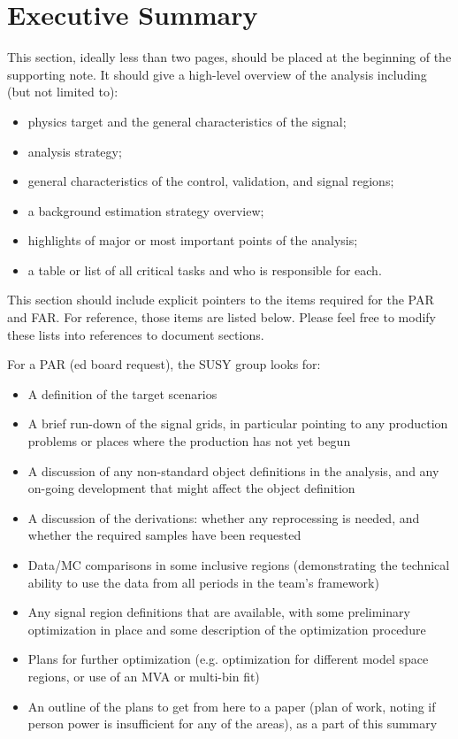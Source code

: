 \section{Executive Summary}

This section, ideally less than two pages, should be placed at the beginning of the supporting note.
It should give a high-level overview of the analysis including (but not limited to):
\begin{itemize}
\item physics target and the general characteristics of the signal;
\item analysis strategy;
\item general characteristics of the control, validation, and signal regions;
\item a background estimation strategy overview;
\item highlights of major or most important points of the analysis;
\item a table or list of all critical tasks and who is responsible for each.
\end{itemize}

This section should include explicit pointers to the items required for the PAR and FAR.  For reference, those items are listed below. Please feel free to modify these lists into references to document sections.

For a PAR (ed board request), the SUSY group looks for:
\begin{itemize}
\item A definition of the target scenarios
\item A brief run-down of the signal grids, in particular pointing to any production problems or places where the production has not yet begun
\item A discussion of any non-standard object definitions in the analysis, and any on-going development that might affect the object definition
\item A discussion of the derivations: whether any reprocessing is needed, and whether the required samples have been requested
\item Data/MC comparisons in some inclusive regions (demonstrating the technical ability to use the data from all periods in the team's framework)
\item Any signal region definitions that are available, with some preliminary optimization in place and some description of the optimization procedure
\item Plans for further optimization (e.g. optimization for different model space regions, or use of an MVA or multi-bin fit)
\item An outline of the plans to get from here to a paper (plan of work, noting if person power is insufficient for any of the areas), as a part of this summary
\end{itemize}

